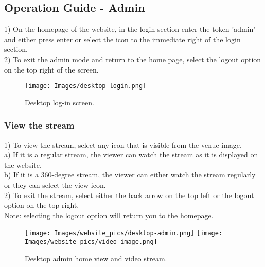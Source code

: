 \documentclass[onecolumn, draftclsnofoot,10pt, compsoc]{IEEEtran}
\begin{document}
\subsection{Operation Guide - Admin}
1) On the homepage of the website, in the login section enter the token 'admin' and either press enter or select the icon to the immediate right of the login section. \\
2) To exit the admin mode and return to the home page, select the logout option on the top right of the screen. \\
\begin{figure}[h]
    \centering
    \texttt{[image: Images/desktop-login.png]} 
    \caption{Desktop log-in screen.}
\label{fig1}
\end{figure}
\subsubsection{View the stream}
1) To view the stream, select any icon that is visible from the venue image. \\
    \hspace*{1cm} a) If it is a regular stream, the viewer can watch the stream as it is displayed on the website. \\
    \hspace*{1cm} b) If it is a 360-degree stream, the viewer can either watch the stream regularly or they can select the view icon. \\
2) To exit the stream, select either the back arrow on the top left or the logout option on the top right. \\
\hspace*{1cm} Note: selecting the logout option will return you to the homepage.
\begin{figure}[h]%
    \centering
    \texttt{[image: Images/website\_pics/desktop-admin.png]}%
    \qquad
    \texttt{[image: Images/website\_pics/video\_image.png]}
    \caption{Desktop admin home view and video stream.}
\end{figure}
\newpage
\end{document}
